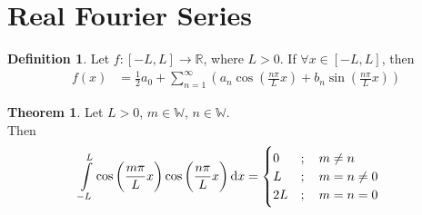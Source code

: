 \documentclass[fleqn, a4paper, 12pt, twoside]{article}
\theoremstyle{definition}
\newtheorem{definition}{Definition}
\theoremstyle{theorem}
\newtheorem{theorem}{Theorem}
\begin{document}
\section{Real Fourier Series}

\begin{definition}
	Let $f : [-L,L] \to \mathbb{R}$, where $L > 0$.
	If $\forall x \in [-L,L]$, then
	\begin{align*}
		f(x) & = \frac{1}{2} a_0 + \sum\limits_{n = 1}^{\infty} \left( a_n \cos\left( \frac{n \pi}{L} x \right) + b_n \sin\left( \frac{n \pi}{L} x \right) \right)
	\end{align*}
\end{definition}

\begin{theorem}
	Let $L > 0$, $m \in \mathbb{W}$, $n \in \mathbb{W}$.\\
	Then
	\begin{align*}
		\int\limits_{-L}^{L} \cos\left( \frac{m \pi}{L} x \right) \cos\left( \frac{n \pi}{L} x \right) \dif x &=
			\begin{cases}
				0   & ;\quad m \neq n     \\
				L   & ;\quad m = n \neq 0 \\
				2 L & ;\quad m = n = 0    \\
			\end{cases}
	\end{align*}
\end{theorem}
\end{document}
